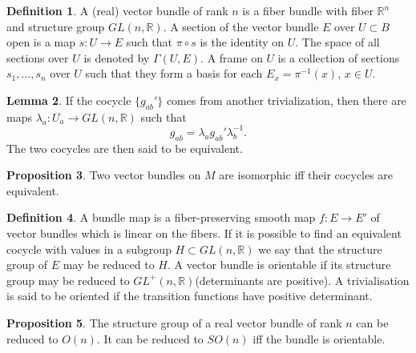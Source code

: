 \documentclass[twocolumn]{article}
\theoremstyle{definition}
\newtheorem{definition}{Definition}[section]
\newtheorem{lemma}[definition]{Lemma}
\newtheorem{proposition}[definition]{Proposition}
\theoremstyle{remark}
\begin{document}
\begin{definition}
    A (real) vector bundle of rank $n$ is a fiber bundle with fiber $\mathbb{R}^n$ and structure group $GL(n, \mathbb{R})$.
    A section of the vector bundle $E$ over $U \subset B$ open is a map $s: U \rightarrow E$ such that $\pi \circ s$ is the identity on $U$.
    The space of all sections over $U$ is denoted by $\Gamma(U, E)$.
    A frame on $U$ is a collection of sections $s_1, \dots, s_n$ over $U$ such that they form a basis for each $E_x = \pi^{-1}(x),\, x\in U$.
\end{definition}
\begin{lemma}
    If the cocycle $\{g_{ab}'\}$ comes from another trivialization, then there are maps $\lambda_a: U_a \rightarrow GL(n,\mathbb{R})$ such that
    \begin{equation}
        g_{ab} = \lambda_a g_{ab}' \lambda^{-1}_b.
    \end{equation}
    The two cocycles are then said to be equivalent.
\end{lemma}
\begin{proposition}
    Two vector bundles on $M$ are isomorphic iff their cocycles are equivalent.
\end{proposition}
\begin{definition}
    A bundle map is a fiber-preserving smooth map $f: E\rightarrow E'$ of vector bundles which is linear on the fibers.
    If it is possible to find an equivalent cocycle with values in a subgroup $H \subset GL(n, \mathbb{R})$ we say that the structure group of $E$ may be reduced to $H$.
    A vector bundle is orientable if its structure group may be reduced to $GL^+(n,\mathbb{R})$(determinants are positive).
    A trivialisation is said to be oriented if the transition functions have positive determinant.
\end{definition}
\begin{proposition}
    The structure group of a real vector bundle of rank $n$ can be reduced to $O(n)$. It can be reduced to $SO(n)$ iff the bundle is orientable.
\end{proposition}
\end{document}
